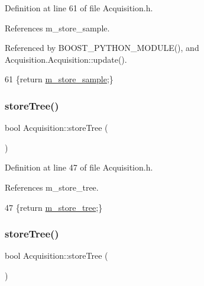 Definition at line 61 of file Acquisition.\+h.



References m\+\_\+store\+\_\+sample.



Referenced by B\+O\+O\+S\+T\+\_\+\+P\+Y\+T\+H\+O\+N\+\_\+\+M\+O\+D\+U\+L\+E(), and Acquisition.\+Acquisition\+::update().


\begin{DoxyCode}
61 \{\textcolor{keywordflow}{return} \hyperlink{classAcquisition_a987cc1d04007cf1f5acc1accfd0909e5}{m\_store\_sample};\}
\end{DoxyCode}
\mbox{\label{classAcquisition_a8ab7e58ccb3fee54eb6850e5081fae10}} 
\subsubsection{\texorpdfstring{store\+Tree()}{storeTree()}\hspace{0.1cm}{\footnotesize\ttfamily [1/2]}}
{\footnotesize\ttfamily bool Acquisition\+::store\+Tree (\begin{DoxyParamCaption}{ }\end{DoxyParamCaption})\hspace{0.3cm}{\ttfamily [inline]}}



Definition at line 47 of file Acquisition.\+h.



References m\+\_\+store\+\_\+tree.


\begin{DoxyCode}
47 \{\textcolor{keywordflow}{return} \hyperlink{classAcquisition_aca2143e9135e25554e58327475a767c5}{m\_store\_tree};\}
\end{DoxyCode}
\mbox{\label{classAcquisition_a8ab7e58ccb3fee54eb6850e5081fae10}} 
\subsubsection{\texorpdfstring{store\+Tree()}{storeTree()}\hspace{0.1cm}{\footnotesize\ttfamily [2/2]}}
{\footnotesize\ttfamily bool Acquisition\+::store\+Tree (\begin{DoxyParamCaption}{ }\end{DoxyParamCaption})\hspace{0.3cm}{\ttfamily [inline]}}



